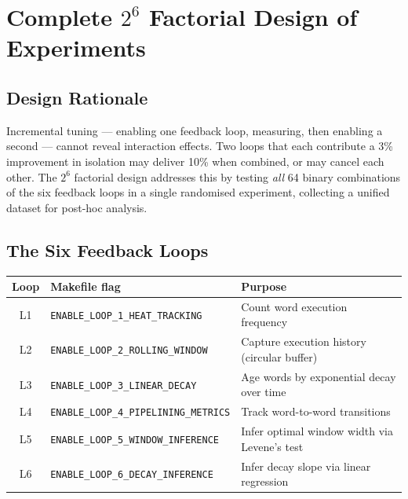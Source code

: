 
\section{Complete $2^6$ Factorial Design of Experiments}
\label{sec:factorial-doe-guide}

\subsection{Design Rationale}

Incremental tuning — enabling one feedback loop, measuring, then enabling a
second — cannot reveal interaction effects. Two loops that each contribute
a 3\% improvement in isolation may deliver 10\% when combined, or may cancel
each other. The $2^6$ factorial design addresses this by testing \emph{all}
64 binary combinations of the six feedback loops in a single randomised
experiment, collecting a unified dataset for post-hoc analysis.

\subsection{The Six Feedback Loops}

\begin{center}
\begin{tabular}{clp{7cm}}
\toprule
Loop & Makefile flag & Purpose \\
\midrule
L1 & \texttt{ENABLE\_LOOP\_1\_HEAT\_TRACKING}    & Count word execution frequency \\
L2 & \texttt{ENABLE\_LOOP\_2\_ROLLING\_WINDOW}   & Capture execution history (circular buffer) \\
L3 & \texttt{ENABLE\_LOOP\_3\_LINEAR\_DECAY}     & Age words by exponential decay over time \\
L4 & \texttt{ENABLE\_LOOP\_4\_PIPELINING\_METRICS} & Track word-to-word transitions \\
L5 & \texttt{ENABLE\_LOOP\_5\_WINDOW\_INFERENCE} & Infer optimal window width via Levene's test \\
L6 & \texttt{ENABLE\_LOOP\_6\_DECAY\_INFERENCE}  & Infer decay slope via linear regression \\
\bottomrule
\end{tabular}
\end{center}

